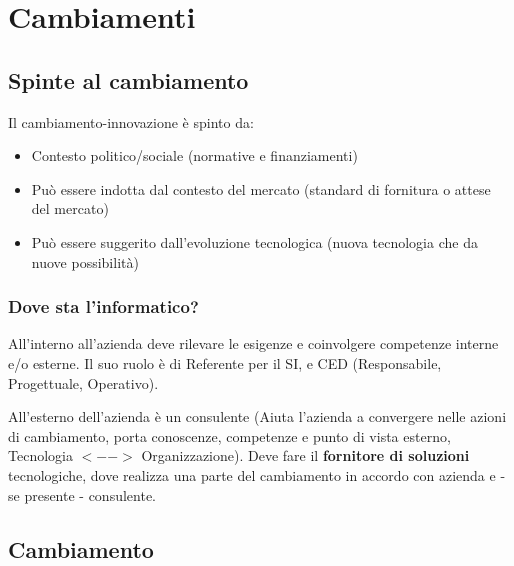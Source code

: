 \chapter{Cambiamenti}

\section{Spinte al cambiamento}

Il cambiamento-innovazione \`e spinto da:

\begin{itemize}
  \item
    Contesto politico/sociale (normative e finanziamenti)
  \item
    Pu\`o essere indotta dal contesto del mercato (standard di fornitura o attese
    del mercato)
  \item
    Pu\`o essere suggerito dall'evoluzione tecnologica (nuova tecnologia che da
    nuove possibilit\`a)
\end{itemize}


\subsection{Dove sta l'informatico?}

All'interno all'azienda deve rilevare le esigenze e coinvolgere competenze
interne e/o esterne. Il suo ruolo \`e di Referente per il SI, e CED
(Responsabile, Progettuale, Operativo).

All'esterno dell'azienda \`e un consulente (Aiuta l'azienda a convergere nelle
azioni di cambiamento, porta conoscenze, competenze e punto di vista esterno,
Tecnologia $<-->$ Organizzazione). Deve fare il \textbf{fornitore di soluzioni}
tecnologiche, dove realizza una parte del cambiamento in accordo con azienda
e - se presente - consulente.

\section{Cambiamento}

